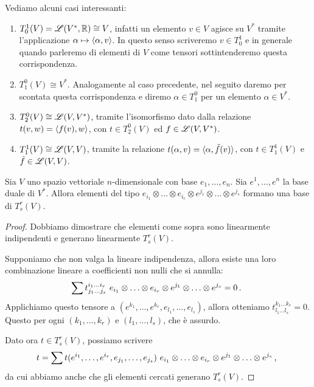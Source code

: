 \begin{example}
	Vediamo alcuni casi interessanti:
	\begin{enumerate}
		\item $T_0^1(V) = \mathscr L(V^*,\mathbb R) \cong V$, infatti un elemento $v\in V$ agisce su $V^*$ tramite l'applicazione $\alpha \mapsto \langle \alpha , v \rangle$. In questo senso scriveremo $v \in T_0^1$ e in generale quando parleremo di elementi di $V$ come tensori sottintenderemo questa corrispondenza.
		\item $T_1^0(V) \cong V^*$. Analogamente al caso precedente, nel seguito daremo per scontata questa corrispondenza e diremo $\alpha \in T_1^0$ per un elemento $\alpha \in V^*$.
		\item $T_2^0(V) \cong \mathscr L(V,V^*)$, tramite l'isomorfismo dato dalla relazione $t(v,w) = \langle f(v) , w \rangle$, con $t\in T_2^0(V)$ ed $f\in\mathscr L(V,V^*)$.
		\item $T_1^1(V) \cong \mathscr L(V,V)$, tramite la relazione $t(\alpha,v) = \langle \alpha , \tilde f (v) \rangle$, con $t\in T_1^1(V)$ e $\tilde f\in \mathscr L(V,V)$.
	\end{enumerate}
\end{example}

\begin{proposition}
	Sia $V$ uno spazio vettoriale $n$-dimensionale con base $e_1,\ldots,e_n$. Sia $e^1,\ldots,e^n$ la base duale di $V^*$. Allora elementi del tipo $e_{i_1}\otimes \ldots \otimes e_{i_r}\otimes e^{j_1}\otimes \ldots \otimes e^{j_s}$ formano una base di $T_s^r(V)$.
\end{proposition}
\begin{proof}
	Dobbiamo dimostrare che elementi come sopra sono linearmente indipendenti e generano linearmente $T_s^r(V)$.
	
	Supponiamo che non valga la lineare indipendenza, allora esiste una loro combinazione lineare a coefficienti non nulli che si annulla:
	\begin{equation*}
		\sum t_{j_1\ldots j_s}^{i_1\ldots i_r}\ e_{i_1}\otimes \ldots \otimes e_{i_r}\otimes e^{j_1}\otimes \ldots \otimes e^{j_s} = 0\punto
	\end{equation*}
	Applichiamo questo tensore a $(e^{k_1},\ldots,e^{k_r},e_{l_1},\ldots,e_{l_s})$, allora otteniamo $t_{l_1\ldots l_s}^{k_1 \ldots k_r} = 0$. Questo per ogni $(k_1,\ldots, k_r)$ e $(l_1,\ldots,l_s)$, che è assurdo.
	
	Dato ora $t\in T_s^r(V)$, possiamo scrivere
	\begin{equation*}
		t = \sum t(e^{i_1},\ldots, e^{i_r},e_{j_1},\ldots, e_{j_s})\ e_{i_1}\otimes \ldots \otimes e_{i_r}\otimes e^{j_1}\otimes \ldots \otimes e^{j_s}\, \text{, }
	\end{equation*}	
	da cui abbiamo anche che gli elementi cercati generano $T_s^r(V)$.
\end{proof}

